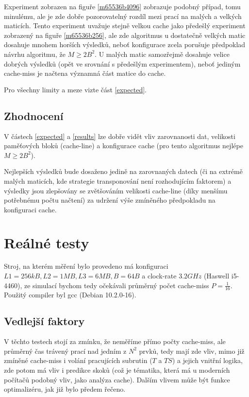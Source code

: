 \documentclass[a4paper,12pt]{article} %
\begin{document}
Experiment zobrazen na figuře \ref{m65536b4096} zobrazuje podobný případ, tomu minulému, ale je zde dobře pozorovatelný rozdíl mezi prací na malých a velkých maticích. Tento experiment uvažuje stejně velkou cache jako předešlý experiment zobrazený na figuře \ref{m65536b256}, ale zde algoritmus u dostatečně velkých matic dosahuje mnohem horších výsledků, neboť konfigurace zcela porušuje předpoklad návrhu algoritmu, že $M \geq 2 B^2$. U malých matic samozřejmě dosahuje velice dobrých výsledků (opět ve srovnání s předešlým experimentem), neboť jediným cache-miss je načtena významná část matice do cache.

Pro všechny limity a meze vizte část \ref{expected}.

\subsection{Zhodnocení}

V částech \ref{expected} a \ref{results} lze dobře vidět vliv zarovnanosti dat, velikosti paměťových bloků (cache-line) a konfigurace cache (pro tento algoritmus nejlépe $M \geq 2 B^2$).

Nejlepších výsledků bude dosaženo jedině na zarovnaných datech (či na extrémě malých maticích, kde strategie transponování není rozhodujícím faktorem) a výsledky jsou zlepšovány se zvětšováním velikosti cache-line (díky menšímu potřebnému počtu načtení) za udržení výše zmíněného předpokladu na konfiguraci cache.

\pagebreak

\section{Reálné testy}

Stroj, na kterém měření bylo provedeno má konfiguraci $L1 = 256 kB, L2 = 1 MB, L3 = 6 MB, B = 64B$ a clock-rate $3.2 GHz$ (Haswell i5-4460), ze simulací bychom tedy očekávali průměrný počet cache-miss $P = \frac{1}{16}$. Použitý compiler byl gcc (Debian 10.2.0-16).

\subsection{Vedlejší faktory}

V těchto testech stojí za zmínku, že neměříme přímo počty cache-miss, ale průměrný čas trávený prací nad jedním z $N^2$ prvků, tedy mají zde vliv, mimo již zmíněné cache-miss i volání pracujících subrutin ($T$ a $TS$) a jejich vnitřní logika, zde potom má vliv i predikce skoků (což je tématika, která má u moderních počítačů podobný vliv, jako analýza cache). Dalším vlivem může být funkce optimalizéru, jak již bylo předem řečeno.
\end{document}
